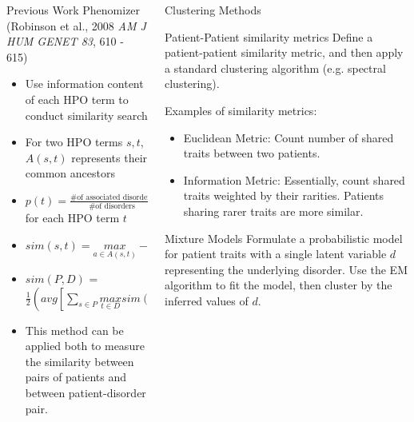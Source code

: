\documentclass[final]{beamer} %
\begin{document}
\begin{frame}{}
\begin{columns}[T]
\begin{column}{0.3\linewidth}
   \begin{block}{\Large Previous Work}
   \Large
   Phenomizer (Robinson et al., 2008 {\it{\Large AM J HUM GENET 83}}, 610 - 615)
   \begin{itemize}
    \item
    Use information content of each HPO term to conduct similarity search
    \item
    For two HPO terms $s, t$, $A(s, t)$ represents their common ancestors
    \item
    $p(t) = \frac{\text{\# of associated disorders}}{\text{\# of disorders}}$ for each HPO term $t$
    \item
    $sim(s, t) = \underset{a \in A(s, t)}{max} -\log p(a)$
    \item
    $sim(P,  D)$ = $\frac{1}{2} ( avg[\sum\limits_{s \in P}
    \underset{t \in D}{max} sim(s, t) ]  +  avg[\sum\limits_{t \in D}
    \underset{s \in P}{max} sim(t, s) ]  ) $ 
    \item
    This method can be applied both to measure the similarity between pairs of patients and between patient-disorder pair.
  \end{itemize}
   \end{block}
    \end{column}

    \begin{column}{0.3\linewidth}
     \begin{block}{\Huge Clustering Methods}
     \Large
		\begin{block}{\Large Patient-Patient similarity metrics}
			Define a patient-patient similarity metric, and then apply a standard clustering algorithm (e.g. spectral clustering).

			Examples of similarity metrics:
			\begin{itemize}
				\item Euclidean Metric: Count number of shared traits between two patients.
				\item Information Metric: Essentially, count shared traits weighted by their rarities. Patients sharing rarer traits are more similar.
			\end{itemize}
		\end{block}
		\begin{block}{\Large Mixture Models}
			Formulate a probabilistic model for patient traits with a single latent variable $d$ representing the underlying disorder. Use the EM algorithm to fit the model, then cluster by the inferred values of $d$.


\end{block}
\end{block}
\end{column}
\end{columns}
\end{frame}
\end{document}
